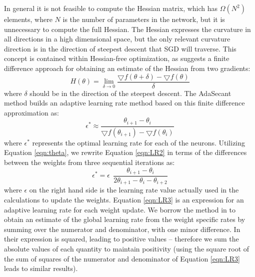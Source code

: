 \documentclass{article}
\begin{document}
In general it is not feasible to compute the Hessian matrix, which has $\Omega(N^2)$ elements, where $N$ is the number of parameters in the network, but it is unnecessary to compute the full Hessian.
The Hessian expresses the curvature in all directions in a high dimensional space, but the only relevant curvature direction is in the direction of steepest descent that SGD will traverse.
This concept is contained within Hessian-free optimization, as \citet{martens2010deep} suggests a finite difference approach for obtaining an estimate of the Hessian from two gradients:
\begin{equation}
H(\theta) = \lim_{\delta \to 0} \frac{\bigtriangledown f(\theta + \delta) - \bigtriangledown f(\theta)}{\delta}
\label{eqn:finite}
\end{equation}
where $\delta$ should be in the direction of the steepest descent.
The AdaSecant method \citep{gulcehre2014adasecant,gulcehre2017robust} builds an adaptive learning rate method based on this finite difference approximation as:
\begin{equation}
\epsilon^*  \approx \frac{\theta_{i+1} - \theta_{i} }{\bigtriangledown f(\theta_{i+1}) - \bigtriangledown f(\theta_{i})}
\label{eqn:LR2}
\end{equation}
where $ \epsilon^* $ represents the optimal learning rate for each of the neurons.
Utilizing Equation \ref{eqn:theta}, we rewrite Equation \ref{eqn:LR2} in terms of the differences between the weights from three sequential iterations as:
\begin{equation}
\epsilon^*  = \epsilon ~~ \frac{\theta_{i+1} - \theta_{i} }{2 \theta_{i+1}  - \theta_{i} - \theta_{i+2}}
\label{eqn:LR3}
\end{equation}
where $\epsilon$ on the right hand side is the learning rate value actually used in the  calculations to update the weights.
Equation \ref{eqn:LR3} is an expression for an adaptive learning rate for each weight update. 
We borrow the method in \citet{schaul2013no} to obtain an estimate of the global learning rate from the weight specific rates by summing over the numerator and denominator, with one minor difference.
In  \citet{schaul2013no} their expression is squared, leading to positive values -- therefore we sum the absolute values of each quantity to maintain positivity (using the square root of the sum of squares of the numerator and denominator of Equation \ref{eqn:LR3} leads to similar results).
\end{document}
